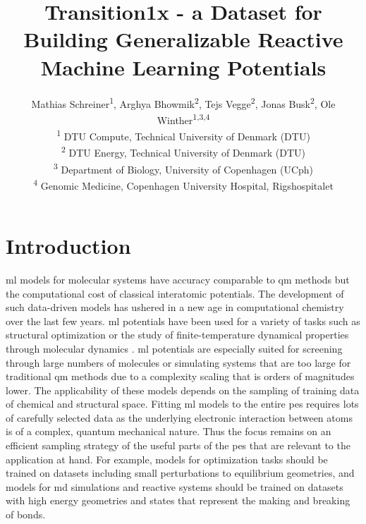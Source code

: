 \documentclass[twoside,twocolumn]{article}
\title{Transition1x - a Dataset for Building Generalizable Reactive Machine Learning Potentials \\ \vspace{-10pt} \hrulefill \vspace{-28pt}} %
\author{%
Mathias Schreiner\textsuperscript{\rm 1}, Arghya Bhowmik\textsuperscript{\rm 2}, Tejs Vegge\textsuperscript{\rm 2}, Jonas Busk\textsuperscript{\rm 2}, Ole Winther\textsuperscript{\rm 1,3,4} \vspace{4pt}
\\  %
\textsuperscript{\rm 1} \normalsize DTU Compute, Technical University of Denmark (DTU)\\
\textsuperscript{\rm 2} \normalsize DTU Energy, Technical University of Denmark (DTU)\\
\textsuperscript{\rm 3} \normalsize Department of Biology, University of Copenhagen (UCph)\\
\textsuperscript{\rm 4} \normalsize Genomic Medicine, Copenhagen University Hospital, Rigshospitalet\\
}
\date{} %
\begin{document}
\maketitle
\section{Introduction}%
\gls{ml} models for molecular systems have accuracy comparable to \gls{qm} methods but the computational cost of classical interatomic potentials\cite{Faber2017NNDFT,Westermayr2021ml4qm1,Campbell2020ml4qm2,behler2007generalized,Westermayr2021qm4ml4}. The development of such data-driven models has ushered in a new age in computational chemistry over the last few years\cite{unke2021machine, behler2021four, huang2021ab,deringer2021gaussian}. \gls{ml} potentials have been used for a variety of tasks such as structural optimization \cite{Kaappa2021structuraloptimization} or the study of finite-temperature dynamical properties through molecular dynamics \cite{Wang2020finitetemp}. \gls{ml} potentials are especially suited for screening through large numbers of molecules or simulating systems that are too large for traditional \gls{qm} methods due to a complexity scaling that is orders of magnitudes lower. The applicability of these models depends on the sampling of training data of chemical and structural space\cite{anatol2020chemspace}. Fitting \gls{ml} models to the entire \gls{pes} requires lots of carefully selected data as the underlying electronic interaction between atoms is of a complex, quantum mechanical nature. Thus the focus remains on an efficient sampling strategy of the useful parts of the \gls{pes} that are relevant to the application at hand. For example, models for optimization tasks should be trained on datasets including small perturbations to equilibrium geometries, and models for \gls{md} simulations and reactive systems should be trained on datasets with high energy geometries and states that represent the making and breaking of bonds. \\
\end{document}
